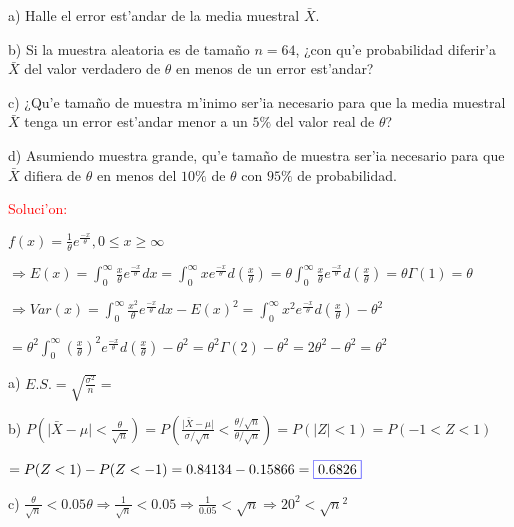 \documentclass{article}
\providecommand{\abs}[1]{\lvert#1\rvert}
\begin{document}
a) Halle el error est'andar de la media muestral $\bar{X}$.

b) Si la muestra aleatoria es de tamaño $n = 64$, ¿con qu'e probabilidad diferir'a $\bar{X}$ del valor verdadero de $\theta$ en menos de un error est'andar?

c) ¿Qu'e tamaño de muestra m'inimo ser'ia necesario para que la media muestral $\bar{X}$ tenga un error est'andar menor a un $5\%$ del valor real de $\theta$?

d) Asumiendo muestra grande, qu'e tamaño de muestra ser'ia necesario para que $\bar{X}$ difiera de $\theta$ en menos del $10\%$ de $\theta$ con $95\%$ de probabilidad.
\vspace{4mm}

\textcolor{red}{Soluci'on:}
\vspace{4mm}

$f(x) = \frac{1}{\theta}e^{\frac{-x}{\theta}},  0\leq x \geq\infty$
\vspace{4mm}

$\Longrightarrow E(x) = \int_0^\infty \frac{x}{\theta}e^{\frac{-x}{\theta}}dx = \int_0^\infty xe^{\frac{-x}{\theta}}d(\frac{x}{\theta}) = \theta\int_0^\infty \frac{x}{\theta}e^{\frac{-x}{\theta}}d(\frac{x}{\theta}) = \theta\Gamma(1) = \theta$
\vspace{5mm}

$\Longrightarrow Var(x) = \int_0^\infty \frac{x^{2}}{\theta}e^{\frac{-x}{\theta}}dx - E(x)^{2}= \int_0^\infty x^{2}e^{\frac{-x}{\theta}}d(\frac{x}{\theta}) - \theta^{2}$
\vspace{3mm}

$= \theta^{2}\int_0^\infty (\frac{x}{\theta})^{2}e^{\frac{-x}{\theta}}d(\frac{x}{\theta}) - \theta^{2} = \theta^{2}\Gamma(2) - \theta^{2} = 2\theta^{2} - \theta^{2} =  \theta^{2}$
\vspace{7mm}

a) 
$E.S. = \sqrt{\frac{\sigma^{2}}{n}} = $
\vspace{5mm}

b)
$P(\abs{\bar{X}-\mu}<\frac{\theta}{\sqrt{n}}) =  P(\frac{\abs{\bar{X}-\mu}}{\sigma/\sqrt{n}}<\frac{\theta/\sqrt{n}}{\theta/\sqrt{n}}) = P(\abs{Z}<1) = P(-1<Z<1)$
\vspace{1mm}

$= P(Z<1)-P(Z<-1) = 0.84134-0.15866 = \fcolorbox{blue}{white}{0.6826}$
\vspace{7mm}

c)
$\frac{\theta}{\sqrt{n}}<0.05\theta \Longrightarrow \frac{1}{\sqrt{n}}<0.05 \Longrightarrow \frac{1}{0.05}<\sqrt{n} \Longrightarrow 20^{2}<\sqrt{n}^{2} $
\vspace{3mm}
\end{document}
